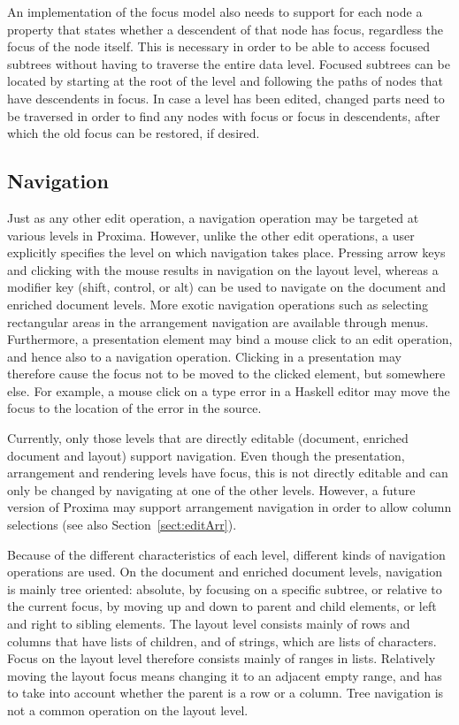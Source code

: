 An implementation of the focus model also needs to support for each node a property that states whether a descendent of that node has focus, regardless the focus of the node itself. This is necessary in order to be able to access focused subtrees without having to traverse the entire data level. Focused subtrees can be located by starting at the root of the level and following the paths of nodes that have descendents in focus.  In case a level has been edited, changed parts need to be traversed in order to find any nodes with focus or focus in descendents, after which the old focus can be restored, if desired.


%																
\subsection{Navigation}

Just as any other edit operation, a navigation operation may be targeted at various levels in Proxima. However, unlike the other edit operations, a user explicitly specifies the level on which navigation takes place. Pressing arrow keys and clicking with the mouse results in navigation on the layout level, whereas a modifier key (shift, control, or alt) can be used to navigate on the document and enriched document levels. \bc More exotic navigation operations such as selecting rectangular areas in the arrangement navigation are available through menus. \ec Furthermore, a presentation element may bind a mouse click to an edit operation, and hence also to a navigation operation. Clicking in a presentation may therefore cause the focus not to be moved to the clicked element, but somewhere else. For example, a mouse click on a type error in a Haskell editor may move the focus to the location of the error in the source.

Currently, only those levels that are directly editable (document, enriched document and layout) support navigation. Even though the presentation, arrangement and rendering levels have focus, this is not directly editable and can only be changed by navigating at one of the other levels. However, a future version of Proxima may support arrangement navigation in order to allow column selections (see also Section~\ref{sect:editArr}).

Because of the different characteristics of each level, different kinds of navigation operations are used. On the document and enriched document levels, navigation is mainly tree oriented: absolute, by focusing on a specific subtree, or relative to the current focus, by moving up and down to parent and child elements, or left and right to sibling elements. The layout level consists mainly of rows and columns that have lists of children, and of strings, which are lists of characters. Focus on the layout level therefore consists mainly of ranges in lists. Relatively moving the layout focus means changing it to an adjacent empty range, and has to take into account whether the parent is a row or a column. Tree navigation is not a common operation on the layout level.

